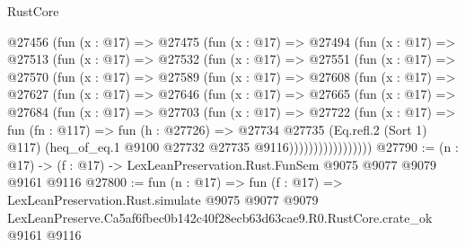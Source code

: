 \begin{lexlean}{RustCore}
\begin{coremodule}
    @27456
      (fun (x : @17) =>
      @27475
        (fun (x : @17) =>
        @27494
          (fun (x : @17) =>
          @27513
            (fun (x : @17) =>
            @27532
              (fun (x : @17) =>
              @27551
                (fun (x : @17) =>
                @27570
                  (fun (x : @17) =>
                  @27589
                    (fun (x : @17) =>
                    @27608
                      (fun (x : @17) =>
                      @27627
                        (fun (x : @17) =>
                        @27646
                          (fun (x : @17) =>
                          @27665
                            (fun (x : @17) =>
                            @27684
                              (fun (x : @17) =>
                              @27703
                                (fun (x : @17) =>
                                @27722
                                  (fun (x : @17) =>
                                  fun (fn : @117) =>
                                  fun (h : @27726) =>
                                  @27734
                                    @27735
                                    (Eq.refl.{2} (Sort 1) @117)
                                    (heq_of_eq.{1} @9100 @27732 @27735 @9116)))))))))))))))))
@27790 := (n : @17) -> (f : @17) -> LexLeanPreservation.Rust.FunSem @9075 @9077 @9079 @9161 @9116
@27800 := fun (n : @17) =>
  fun (f : @17) =>
  LexLeanPreservation.Rust.simulate
    @9075
    @9077
    @9079
    LexLeanPreserve.Ca5af6fbec0b142c40f28ecb63d63cae9.R0.RustCore.crate_ok
    @9161
    @9116
\end{coremodule}
\end{lexlean}
